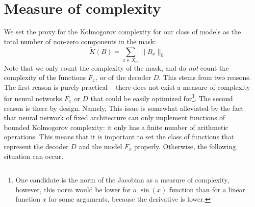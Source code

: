 \documentclass[a4paper,11pt,oneside]{report}
\begin{document}
\section{Measure of complexity}
We set the proxy for the Kolmogorov complexity for our class of models as the total number of non-zero components in the mask:
$$
\tilde{K}(B)=\sum\limits_{x\in X_{in}}\|B_x\|_0
$$
Note that we only count the complexity of the mask, and do {\em not} count the complexity of the functions $F_x$, or of the decoder $D$. This stems from two reasons. The first reason is purely practical -- there does not exist a measure of complexity for neural networks $F_x$ or $D$ that could be easily optimized for\footnote{One candidate is the norm of the Jacobian as a measure of complexity, however, this norm would be lower for a $\sin(x)$ function than for a linear function $x$ for some arguments, because the derivative is lower.}. The second reason is there by design. Namely,
This issue is somewhat alleviated by the fact that neural network of fixed architecture can only implement functions of bounded Kolmogorov complexity: it only has a finite number of arithmetic operations. This means that it is important to set the class of functions that represent the decoder $D$ and the model $F_x$ properly. Otherwise, the following situation can occur.
\end{document}
